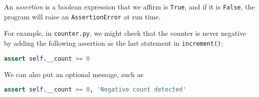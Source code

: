 \documentclass[8pt,a4paper,compress,handout]{beamer}
\begin{document}
\begin{frame}[fragile]
An \emph{assertion} is a boolean expression that we affirm is \lstinline{True}, and if it is \lstinline{False}, the program will raise an \lstinline{AssertionError} at run time.

\bigskip
For example, in \lstinline{counter.py}, we might check that the counter is never negative by adding the following assertion as the last statement in \lstinline{increment()}:
\begin{lstlisting}[language=Python]
assert self.__count >= 0
\end{lstlisting} 

We can also put an optional message, such as
\begin{lstlisting}[language=Python]
assert self.__count >= 0, 'Negative count detected'
\end{lstlisting} 
\end{frame}
\end{document}

